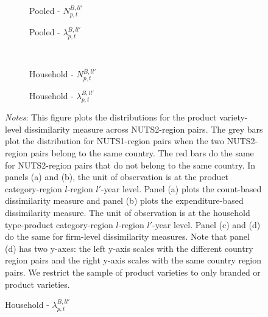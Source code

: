  \begin{figure}[H]
    \centering
    \caption{Choice set differences: Branded product varieties}
    \label{fig: app_redform_bar_b}
    \begin{subfigure}[t]{.49\textwidth}
         \centering
         \caption{Pooled - $N^{B,ll'}_{p,t}$}
         \scalebox{0.45}{}
     \end{subfigure}
     \begin{subfigure}[t]{.49\textwidth}
         \centering
         \caption{Pooled - $\lambda^{B,ll'}_{p,t}$}
         \scalebox{0.45}{}
     \end{subfigure}\\
     \begin{subfigure}[t]{.49\textwidth}
         \centering
         \caption{Household - $N^{B,ll'}_{p,t}$}
         \scalebox{0.45}{}
     \end{subfigure}
     \begin{subfigure}[t]{.49\textwidth}
         \centering
         \caption{Household - $\lambda^{B,ll'}_{p,t}$}
         \scalebox{0.45}{}
     \end{subfigure}
     \parbox{\textwidth}{
        \begin{spacing}{1} 
            {\footnotesize 
            \textit{Notes}: This figure plots the distributions for the product variety-level dissimilarity measure across NUTS2-region pairs. The grey bars plot the distribution for NUTS1-region pairs when the two NUTS2-region pairs belong to the same country. The red bars do the same for NUTS2-region pairs that do not belong to the same country. In panels (a) and (b), the unit of observation is at the product category-region $l$-region $l'$-year level. Panel (a) plots the count-based dissimilarity measure and panel (b) plots the expenditure-based dissimilarity measure. The unit of observation is at the household type-product category-region $l$-region $l'$-year level. Panel (c) and (d) do the same for firm-level dissimilarity measures. Note that panel (d) has two y-axes: the left y-axis scales with the different country region pairs and the right y-axis scales with the same country region pairs. We restrict the sample of product varieties to only branded or product varieties.}
        \end{spacing}}
 \end{figure} 

